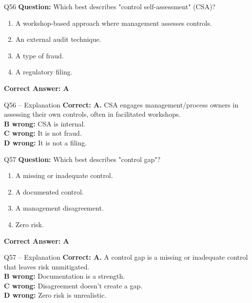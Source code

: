 \documentclass[aspectratio=169,10pt]{beamer}
\begin{document}
	\begin{frame}[t]{Q56}
		\small
		\textbf{Question:} Which best describes "control self-assessment" (CSA)?
		\begin{enumerate}[label=\Alph*.,itemsep=1pt,topsep=2pt]
			\item A workshop-based approach where management assesses controls.
			\item An external audit technique.
			\item A type of fraud.
			\item A regulatory filing.
		\end{enumerate}
		\vspace{4pt}
		\textbf{Correct Answer: A}
	\end{frame}
	
	\begin{frame}[t]{Q56 -- Explanation}
		\small
		\textbf{Correct: A.} CSA engages management/process owners in assessing their own controls, often in facilitated workshops. \\[4pt]
		\textbf{B wrong:} CSA is internal. \\[2pt]
		\textbf{C wrong:} It is not fraud. \\[2pt]
		\textbf{D wrong:} It is not a filing.
	\end{frame}
	
	\begin{frame}[t]{Q57}
		\small
		\textbf{Question:} Which best describes "control gap"?
		\begin{enumerate}[label=\Alph*.,itemsep=1pt,topsep=2pt]
			\item A missing or inadequate control.
			\item A documented control.
			\item A management disagreement.
			\item Zero risk.
		\end{enumerate}
		\vspace{4pt}
		\textbf{Correct Answer: A}
	\end{frame}
	
	\begin{frame}[t]{Q57 -- Explanation}
		\small
		\textbf{Correct: A.} A control gap is a missing or inadequate control that leaves risk unmitigated. \\[4pt]
		\textbf{B wrong:} Documentation is a strength. \\[2pt]
		\textbf{C wrong:} Disagreement doesn't create a gap. \\[2pt]
		\textbf{D wrong:} Zero risk is unrealistic.
	\end{frame}
	
\end{document}
